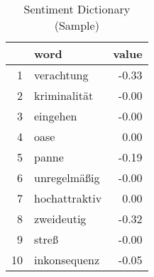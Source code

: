 \begin{table}[ht]
\centering
\caption{Sentiment Dictionary (Sample)} 
\begin{tabular}{rlr}
  \hline
 & word & value \\ 
  \hline
1 & verachtung & -0.33 \\ 
  2 & kriminalität & -0.00 \\ 
  3 & eingehen & -0.00 \\ 
  4 & oase & 0.00 \\ 
  5 & panne & -0.19 \\ 
  6 & unregelmäßig & -0.00 \\ 
  7 & hochattraktiv & 0.00 \\ 
  8 & zweideutig & -0.32 \\ 
  9 & streß & -0.00 \\ 
  10 & inkonsequenz & -0.05 \\ 
   \hline
\end{tabular}
\label{t_sentdict}
\end{table}
